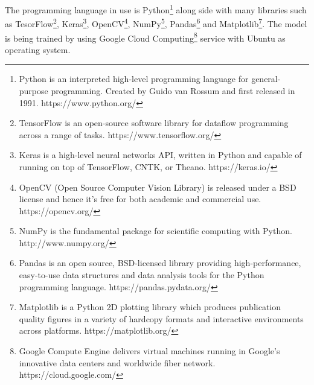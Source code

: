 \documentclass[12pt]{report}
\begin{document}
The programming language in use is Python\footnote{Python is an interpreted high-level programming language for general-purpose programming. Created by Guido van Rossum and first released in 1991. https://www.python.org/} along side with many
libraries such as TesorFlow\footnote{TensorFlow is an open-source software library for dataflow programming across a range of tasks. https://www.tensorflow.org/},
Keras\footnote{Keras is a high-level neural networks API, written in Python and capable of running on top of TensorFlow, CNTK, or Theano. https://keras.io/}, 
OpenCV\footnote{OpenCV (Open Source Computer Vision Library) is released under a BSD license and hence it’s free for both academic and commercial use. https://opencv.org/}, 
NumPy\footnote{NumPy is the fundamental package for scientific computing with Python. http://www.numpy.org/}, 
Pandas\footnote{Pandas is an open source, BSD-licensed library providing high-performance, easy-to-use data structures and data analysis tools for the Python programming language. https://pandas.pydata.org/}
and Matplotlib\footnote{Matplotlib is a Python 2D plotting library which produces publication quality figures in a variety of hardcopy formats and interactive environments across platforms. https://matplotlib.org/}.
The model is being trained by using Google Cloud Computing\footnote{Google Compute Engine delivers virtual machines running in Google's innovative data centers and worldwide fiber network. https://cloud.google.com/} service with Ubuntu as operating system.


\renewcommand\bibname{References}            


\end{document}
